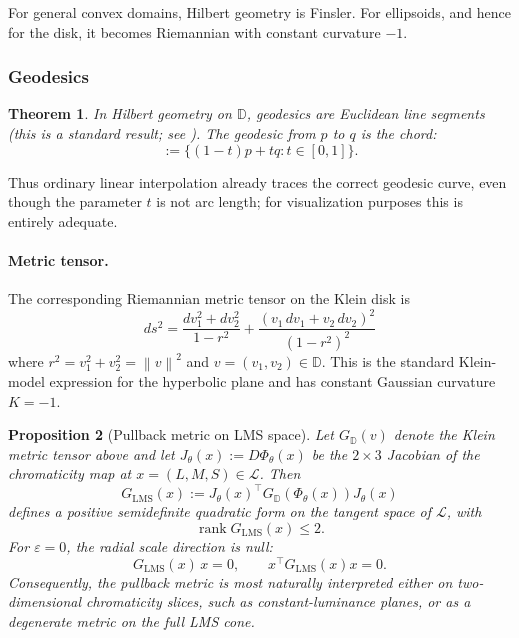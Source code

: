 \documentclass[11pt]{article}
\theoremstyle{plain}
\newtheorem{theorem}{Theorem}[section]
\newtheorem{proposition}[theorem]{Proposition}
\theoremstyle{definition}
\theoremstyle{remark}
\newcommand{\D}{\mathbb{D}}
\newcommand{\norm}[1]{\left\lVert #1 \right\rVert}
\begin{document}
For general convex domains, Hilbert geometry is Finsler. For ellipsoids, and hence for the disk, it becomes Riemannian with constant curvature $-1$.

\subsubsection{Geodesics}

\begin{theorem}
\label{thm:geodesics}
In Hilbert geometry on $\D$, geodesics are Euclidean line segments (this is a standard result; see \cite{Berthier2020}). The geodesic from $p$ to $q$ is the chord:
\begin{equation}
[p,q] := \{(1-t)p + tq : t \in [0,1]\}.
\end{equation}
\end{theorem}

Thus ordinary linear interpolation already traces the correct geodesic curve, even though the parameter $t$ is not arc length; for visualization purposes this is entirely adequate.

\paragraph{Metric tensor.} The corresponding Riemannian metric tensor on the Klein disk is
\begin{equation}
ds^2 = \frac{dv_1^2 + dv_2^2}{1 - r^2} + \frac{(v_1 \, dv_1 + v_2 \, dv_2)^2}{(1 - r^2)^2}
\end{equation}
where $r^2 = v_1^2 + v_2^2 = \norm{v}^2$ and $v = (v_1, v_2) \in \D$. This is the standard Klein-model expression for the hyperbolic plane and has constant Gaussian curvature $K = -1$.

\begin{proposition}[Pullback metric on LMS space]
\label{prop:pullback-metric}
Let $G_\D(v)$ denote the Klein metric tensor above and let
$J_\theta(x) := D\Phi_\theta(x)$ be the $2 \times 3$ Jacobian of the chromaticity map at $x=(L,M,S) \in \mathcal{L}$. Then
\begin{equation}
G_{\mathrm{LMS}}(x)
:= J_\theta(x)^\top G_\D(\Phi_\theta(x)) J_\theta(x)
\end{equation}
defines a positive semidefinite quadratic form on the tangent space of $\mathcal{L}$, with
\[
\operatorname{rank} G_{\mathrm{LMS}}(x) \leq 2.
\]
For $\varepsilon=0$, the radial scale direction is null:
\begin{equation}
G_{\mathrm{LMS}}(x)\,x = 0,
\qquad
x^\top G_{\mathrm{LMS}}(x)x = 0.
\end{equation}
Consequently, the pullback metric is most naturally interpreted either on two-dimensional chromaticity slices, such as constant-luminance planes, or as a degenerate metric on the full LMS cone.
\end{proposition}
\end{document}

